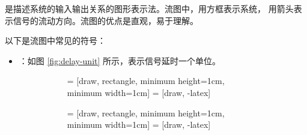 \begin{definition}[流图]
    是描述系统的输入输出关系的图形表示法。流图中，用方框表示系统，
    用箭头表示信号的流动方向。流图的优点是直观，易于理解。

    以下是流图中常见的符号：
    \begin{itemize}
        \item {}：如图 \ref{fig:delay-unit} 所示，表示信号延时一个单位。
            \begin{figure}[H]
                \centering
                \begin{subfigure}{0.45\textwidth}
                    \centering
                     = [draw, rectangle, minimum height=1cm, minimum width=1cm]
                     = [draw, -latex]
                \end{subfigure}
                \hfill
                \begin{subfigure}{0.45\textwidth}
                    \centering
                    \centering
                     = [draw, rectangle, minimum height=1cm, minimum width=1cm]
                     = [draw, -latex]
\end{subfigure}
\end{figure}
\end{itemize}
\end{definition}
